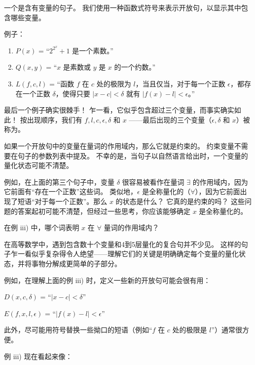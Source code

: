 一个是含有变量的句子。
我们使用一种函数式符号来表示开放句，以显示其中包含哪些变量。

例子：

\begin{enumerate}

\item[i)] $P(x)$ = “$2^{2^x}+1$ 是一个素数。”

\item[ii)] 
$Q(x,y)$ = “$x$ 是素数或 $y$ 是 $x$ 的一个约数。”

\item[iii)] 
$L(f,c,l)$ = “函数 $f$ 在 $c$ 处的极限为 $l$，当且仅当，对于每一个正数 $\epsilon$，都存在一个正数 $\delta$，使得只要 $|x-c| < \delta$ 就有 $|f(x)-l| < \epsilon$。”
\end{enumerate}

最后一个例子确实很棘手！
乍一看，它似乎包含超过三个变量，而事实确实如此！
按出现顺序，我们有 $f, l, c, \epsilon, \delta$ 和 $x$ ——最后出现的三个变量（$\epsilon, \delta$ 和 $x$）被称为。

如果一个开放句中的变量在量词的作用域内，那么它就是约束的。
约束变量不需要在句子的参数列表中提及。
不幸的是，当句子以自然语言给出时，一个变量的量化状态可能不清楚。

例如，在上面的第三个句子中，变量 $\delta$ 很容易被看作在量词 $\exists$ 的作用域内，因为它前面有“存在一个正数”这些词。
类似地，$\epsilon$ 是全称量化的（$\forall$），因为它前面出现了短语“对于每一个正数”。那么 $x$ 的状态是什么？
它真的是约束的吗？
这些问题的答案起初可能不清楚，但经过一些思考，你应该能够确定 $x$ 是全称量化的。

\begin{exer} 
在例 iii) 中，哪个词表明 $x$ 在 $\forall$ 量词的作用域内？
\end{exer}

在高等数学中，遇到包含数十个变量和4到5层量化的复合句并不少见。
这样的句子乍一看似乎复杂得令人绝望——理解它们的关键是明确确定每个变量的量化状态，并将事物分解成更简单的子部分。

例如，在理解上面的例 iii) 时，定义一些新的开放句可能会很有用：

$D(x,c,\delta)$ = ``$|x-c| < \delta$''

$E(f,x,l,\epsilon)$ = ``$|f(x)-l| < \epsilon$''

\noindent 此外，尽可能用符号替换一些拗口的短语（例如“$f$ 在 $c$ 处的极限是 $l$”）通常很方便。

例 iii) 现在看起来像：

